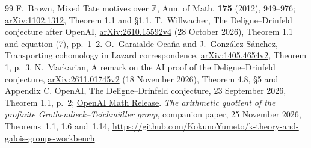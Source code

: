 \documentclass[11pt]{article}
\newcommand{\workbenchurl}{https://github.com/KokunoYumeto/k-theory-and-galois-groups-workbench}
\newcommand{\Z}{\mathbb Z}
\theoremstyle{definition}
\theoremstyle{remark}
\begin{document}
\begin{thebibliography}{99}
 F.~Brown, Mixed Tate motives over $\Z$,
Ann. of Math. \textbf{175} (2012), 949--976;
\href{https://arxiv.org/abs/1102.1312}{arXiv:1102.1312}, Theorem 1.1 and \S1.1.
 T.~Willwacher, The Deligne--Drinfeld conjecture
after OpenAI, \href{https://arxiv.org/abs/2610.15592}{arXiv:2610.15592v4}
(28 October 2026), Theorem 1.1 and equation (7), pp.~1--2.
 O.~Garaialde Oca\~na and J.~Gonz\'alez-S\'anchez,
Transporting cohomology in Lazard correspondence,
\href{https://arxiv.org/abs/1405.4654}{arXiv:1405.4654v2},
Theorem 1, p.~3.
 N.~Markarian, A remark on the AI proof of the
Deligne--Drinfeld conjecture,
\href{https://arxiv.org/abs/2611.01745}{arXiv:2611.01745v2}
(18 November 2026), Theorem 4.8, \S5 and Appendix C.
 OpenAI, The Deligne--Drinfeld conjecture, 23 September
2026, Theorem 1.1, p.~2; \href{https://github.com/openai/math/blob/main/preprints/The-Deligne-Drinfeld-conjecture-September-23-2026/paper.pdf}{OpenAI Math Release}.
 \emph{The arithmetic quotient of the profinite
Grothendieck--Teichm\"uller group}, companion paper, 25 November 2026,
Theorems~1.1, 1.6 and~1.14, \url{\workbenchurl}.
\end{thebibliography}

\end{document}
